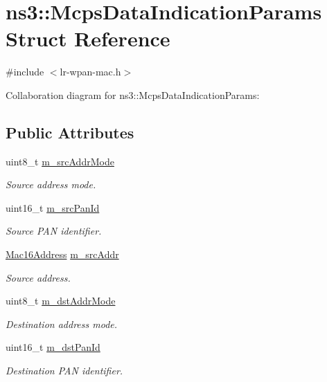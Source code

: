 \hypertarget{structns3_1_1McpsDataIndicationParams}{}\section{ns3\+:\+:Mcps\+Data\+Indication\+Params Struct Reference}
\label{structns3_1_1McpsDataIndicationParams}


{\ttfamily \#include $<$lr-\/wpan-\/mac.\+h$>$}



Collaboration diagram for ns3\+:\+:Mcps\+Data\+Indication\+Params\+:
\subsection*{Public Attributes}
\begin{DoxyCompactItemize}
\item 
uint8\+\_\+t \hyperlink{structns3_1_1McpsDataIndicationParams_ae2261f74b48defa0e8f73265ea8f097d}{m\+\_\+src\+Addr\+Mode}
\begin{DoxyCompactList}\small\item\em Source address mode. \end{DoxyCompactList}\item 
uint16\+\_\+t \hyperlink{structns3_1_1McpsDataIndicationParams_aa009743fe0885f0d00f174f29a1d118b}{m\+\_\+src\+Pan\+Id}
\begin{DoxyCompactList}\small\item\em Source P\+AN identifier. \end{DoxyCompactList}\item 
\hyperlink{classns3_1_1Mac16Address}{Mac16\+Address} \hyperlink{structns3_1_1McpsDataIndicationParams_afcfcb3e24abb4a6461d3b5b53bda6d64}{m\+\_\+src\+Addr}
\begin{DoxyCompactList}\small\item\em Source address. \end{DoxyCompactList}\item 
uint8\+\_\+t \hyperlink{structns3_1_1McpsDataIndicationParams_a081c9ce94b42c5c8108dee8117df3ff2}{m\+\_\+dst\+Addr\+Mode}
\begin{DoxyCompactList}\small\item\em Destination address mode. \end{DoxyCompactList}\item 
uint16\+\_\+t \hyperlink{structns3_1_1McpsDataIndicationParams_a1bd1e3d38fb8590ab112dec199343871}{m\+\_\+dst\+Pan\+Id}
\begin{DoxyCompactList}\small\item\em Destination P\+AN identifier. \end{DoxyCompactList}\item 

\end{DoxyCompactItemize}
